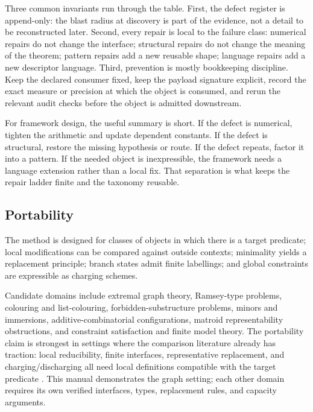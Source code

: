 \documentclass[
  11pt,
]{article}
\theoremstyle{definition}
\begin{document}
Three common invariants run through the table. First, the defect register is
append-only: the blast radius at discovery is part of the evidence, not a
detail to be reconstructed later. Second, every repair is local to the
failure class: numerical repairs do not change the interface; structural
repairs do not change the meaning of the theorem; pattern repairs add a
new reusable shape; language repairs add a new descriptor language. Third,
prevention is mostly bookkeeping discipline. Keep the declared consumer
fixed, keep the payload signature explicit, record the exact measure or
precision at which the object is consumed, and rerun the relevant audit
checks before the object is admitted downstream.

For framework design, the useful summary is short. If the defect is
numerical, tighten the arithmetic and update dependent constants. If the
defect is structural, restore the missing hypothesis or route. If the
defect repeats, factor it into a pattern. If the needed object is
inexpressible, the framework needs a language extension rather than a
local fix. That separation is what keeps the repair ladder finite and the
taxonomy reusable.

\subsection{Portability}\label{portability}

The method is designed for classes of objects in which there is a target
predicate; local modifications can be compared against outside contexts;
minimality yields a replacement principle; branch states admit finite
labellings; and global constraints are expressible as charging schemes.

Candidate domains include extremal graph theory,
Ramsey-type problems, colouring and list-colouring, forbidden-substructure
problems, minors and immersions, additive-combinatorial configurations,
matroid representability obstructions, and constraint satisfaction and
finite model theory. The portability claim is strongest in settings
where the comparison literature already has traction: local
reducibility, finite interfaces, representative replacement, and
charging/discharging all need local definitions compatible with the
target predicate
\citep{appel-haken-1977-discharging, robertson-etal-1997-four-colour, courcelle-1990-mso-graphs, courcelle-engelfriet-2012-graph-structure, bodlaender-etal-2009-meta-kernelization}.
This manual demonstrates the graph setting; each other domain requires
its own verified interfaces, types, replacement rules, and capacity
arguments.
\end{document}

